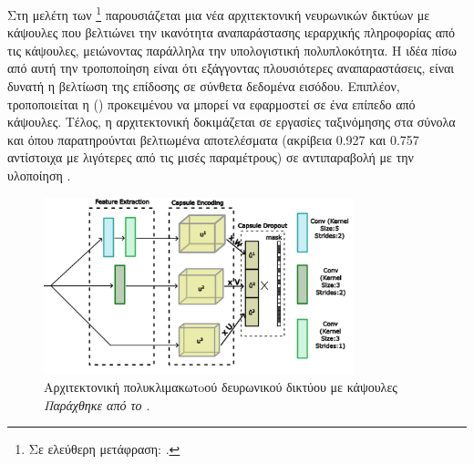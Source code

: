 \subsubsection{}

Στη μελέτη των  \footnote{Σε ελεύθερη μετάφραση: .} \cite{xiang2018ms} παρουσιάζεται μια νέα αρχιτεκτονική νευρωνικών δικτύων με κάψουλες που βελτιώνει την ικανότητα αναπαράστασης ιεραρχικής πληροφορίας από τις κάψουλες, μειώνοντας παράλληλα την υπολογιστική πολυπλοκότητα. Η ιδέα πίσω από αυτή την τροποποίηση είναι ότι εξάγγοντας πλουσιότερες αναπαραστάσεις, είναι δυνατή η βελτίωση της επίδοσης σε σύνθετα δεδομένα εισόδου. Επιπλέον, τροποποιείται η  () προκειμένου να μπορεί να εφαρμοστεί σε ένα επίπεδο από κάψουλες. Τέλος, η αρχιτεκτονική δοκιμάζεται σε εργασίες ταξινόμησης στα σύνολα  και  όπου παρατηρούνται βελτιωμένα αποτελέσματα (ακρίβεια 0.927 και 0.757 αντίστοιχα με λιγότερες από τις μισές παραμέτρους) σε αντιπαραβολή με την υλοποίηση \cite{sabour2017dynamic}.\par

\begin{figure}[h]
    \centering
    \includegraphics[width=0.8\textwidth]{images/chapter realted work/ms_capsnet.pdf}
    \caption{Αρχιτεκτονική πολυ\textendash κλιμακωτoού δευρωνικού δικτύου με κάψουλες \textit{Παράχθηκε από το \href{https://inkscape.org/}{}}.}
    \label{fig:ms_capsnet}
\end{figure}

